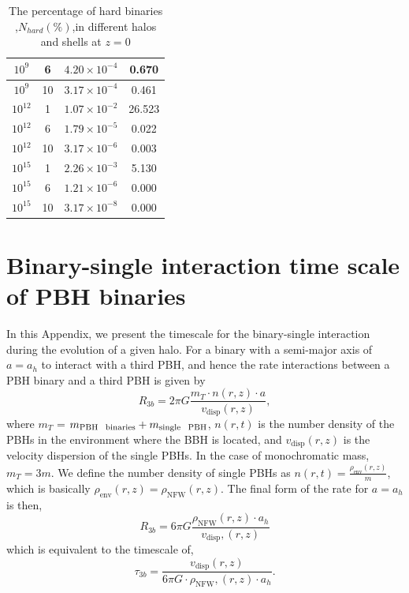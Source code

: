 \documentclass[aps, prd, reprint, nofootinbib]{revtex4-2}
\begin{document}
\begin{appendix}
\begin{table}[h!]
\begin{tabular}{|c|c|c|c|}
        $ 10^{9}$ & 6 & $4.20 \times 10^{-4}$ & 0.670 \\
                \hline

        $ 10^{9}$ & 10 & $3.17 \times 10^{-4}$ & 0.461 \\
                \hline

        $ 10^{12}$ & 1 & $1.07 \times 10^{-2}$ & 26.523 \\
                \hline

        $ 10^{12}$ & 6 & $1.79 \times 10^{-5}$ & 0.022 \\
                \hline

        $ 10^{12}$ & 10 & $3.17 \times 10^{-6}$ & 0.003 \\
                \hline

        $ 10^{15}$ & 1 & $2.26 \times 10^{-3}$ & 5.130 \\
                \hline

        $ 10^{15}$ & 6 & $1.21 \times 10^{-6}$ & 0.000 \\
                \hline

        $ 10^{15}$ & 10 & $3.17 \times 10^{-8}$ & 0.000 \\
                \hline

        \end{tabular}
    \caption{The percentage of hard binaries ,$N_{hard} (\%)$,in different halos  and shells at $z=0$}
    \label{N_hard}
\end{table}

\section{Binary-single interaction time scale of PBH binaries}\label{Timescale_app}
In this Appendix, we present the timescale for the binary-single interaction during the evolution of a given halo. 
For a binary with a semi-major axis of $a=a_h$ to interact with a third PBH, and hence the rate interactions between a PBH binary and a third PBH is given by
\begin{equation}
R_{3b}=2 \pi G \frac{m_T \cdot  n(r,z) \cdot a}{v_{\textrm{disp}}(r,z)},
\end{equation}
where $m_{T}$ = $m_\textrm{PBH \, binaries}+m_{\textrm{single \, PBH}}$, $n(r,t)$ is the number density of the PBHs in the environment where the BBH is located, and $v_{\textrm{disp}}(r,z)$ is the velocity dispersion of the  single PBHs. In the case of monochromatic mass, $m_{T}=3m$. We define the number density of single PBHs as $n(r,t)=\frac{\rho_{\textrm{env}}(r,z)}{m}$, which is basically $\rho_{\textrm{env}}(r,z) =\rho_{\textrm{NFW}}(r,z)$. The final form of the rate for $a=a_h$ is then, 
\begin{equation}
R_{3b}=6 \pi G \frac{   \rho_{\textrm{NFW}}(r,z)\cdot a_{h}}{v_{\textrm{disp}},(r,z)}
\end{equation}
which is equivalent to the  timescale of, 
\begin{equation} 
\tau_{3b}=\frac{v_{\textrm{disp}}(r,z)}{6 \pi G \cdot  \rho_{\textrm{NFW}},(r,z)\cdot a_{h}}.
\end{equation}


\end{appendix}
\end{document}
